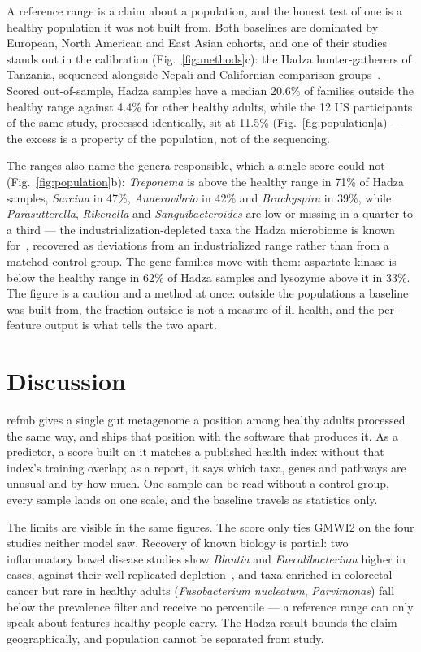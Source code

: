 \documentclass[conference]{IEEEtran}
\begin{document}
A reference range is a claim about a population, and the honest test of one is a healthy population it was not built from. Both baselines are dominated by European, North American and East Asian cohorts, and one of their studies stands out in the calibration (Fig.~\ref{fig:methods}c): the Hadza hunter-gatherers of Tanzania, sequenced alongside Nepali and Californian comparison groups~\cite{carter2023}. Scored out-of-sample, Hadza samples have a median 20.6\% of families outside the healthy range against 4.4\% for other healthy adults, while the 12 US participants of the same study, processed identically, sit at 11.5\% (Fig.~\ref{fig:population}a) --- the excess is a property of the population, not of the sequencing.

The ranges also name the genera responsible, which a single score could not (Fig.~\ref{fig:population}b): \textit{Treponema} is above the healthy range in 71\% of Hadza samples, \textit{Sarcina} in 47\%, \textit{Anaerovibrio} in 42\% and \textit{Brachyspira} in 39\%, while \textit{Parasutterella}, \textit{Rikenella} and \textit{Sanguibacteroides} are low or missing in a quarter to a third --- the industrialization-depleted taxa the Hadza microbiome is known for~\cite{carter2023}, recovered as deviations from an industrialized range rather than from a matched control group. The gene families move with them: aspartate kinase is below the healthy range in 62\% of Hadza samples and lysozyme above it in 33\%. The figure is a caution and a method at once: outside the populations a baseline was built from, the fraction outside is not a measure of ill health, and the per-feature output is what tells the two apart.

\section{Discussion}

refmb gives a single gut metagenome a position among healthy adults processed the same way, and ships that position with the software that produces it. As a predictor, a score built on it matches a published health index without that index's training overlap; as a report, it says which taxa, genes and pathways are unusual and by how much. One sample can be read without a control group, every sample lands on one scale, and the baseline travels as statistics only.

The limits are visible in the same figures. The score only ties GMWI2 on the four studies neither model saw. Recovery of known biology is partial: two inflammatory bowel disease studies show \textit{Blautia} and \textit{Faecalibacterium} higher in cases, against their well-replicated depletion~\cite{lloydprice2019,franzosa2019}, and taxa enriched in colorectal cancer but rare in healthy adults (\textit{Fusobacterium nucleatum}, \textit{Parvimonas}) fall below the prevalence filter and receive no percentile --- a reference range can only speak about features healthy people carry. The Hadza result bounds the claim geographically, and population cannot be separated from study.
\end{document}
